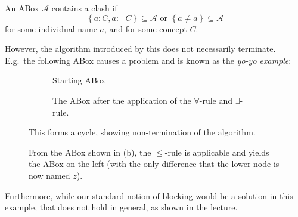 \newpage
\begin{mdframed}[frametitle= The new clash]
An ABox $\mathcal{A}$ contains a clash if
\[
\left\{ a:C, a: \neg C \right\} \subseteq \mathcal{A} \text{ or } \left\{ a \neq a \right\} \subseteq \mathcal{A}
\]
for some individual name $a$, and for some concept $C$.
\end{mdframed}
However, the algorithm introduced by this does not necessarily terminate.
E.g.\ the following ABox causes a problem and is known as the \textit{yo-yo example}:
	\begin{figure}[H]
		\centering
		\begin{subfigure}[t]{.475\textwidth}
			\centering
			\caption{Starting ABox}
		\end{subfigure}
		\hfill
		\begin{subfigure}[t]{.475\textwidth}
			\centering
			\caption{The ABox after the application of the $\forall$-rule and $\exists$-rule.}
		\end{subfigure}
		\caption{From the ABox shown in (b), the $ \leq$-rule is applicable and yields the ABox on the left
		(with the only difference that the lower node is now named $z$).}
		This forms a cycle, showing non-termination of the algorithm.
	\end{figure}

Furthermore, while our standard notion of blocking would be a solution in this example,
that does not hold in general, as shown in the lecture.
